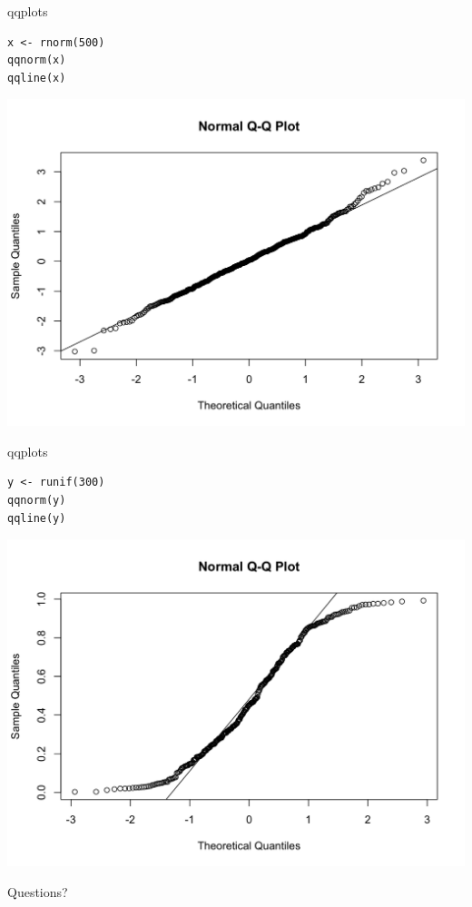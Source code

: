 \documentclass[12pt, t, xcolor=dvipsnames]{beamer}
\begin{document}
\begin{frame}[fragile]{qqplots}
\begin{verbatim}
x <- rnorm(500)
qqnorm(x)
qqline(x)
\end{verbatim}

\includegraphics[height=0.5\textheight, keepaspectratio]{rnorm_qqnorm}
\end{frame}

\begin{frame}[fragile]{qqplots}
\begin{verbatim}
y <- runif(300)
qqnorm(y)
qqline(y)
\end{verbatim}

\includegraphics[height=0.5\textheight, keepaspectratio]{runif_qqnorm}
\end{frame}







\begin{frame}[c]
  \large{Questions?}
\end{frame}
\end{document}
